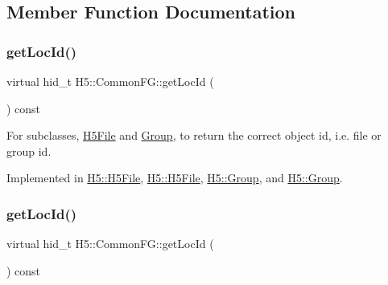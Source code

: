 \subsection{Member Function Documentation}
\mbox{\label{class_h5_1_1_common_f_g_a28dd053d0fa4ebad7fca2949e65d1987}} 
\subsubsection{\texorpdfstring{get\+Loc\+Id()}{getLocId()}\hspace{0.1cm}{\footnotesize\ttfamily [1/2]}}
{\footnotesize\ttfamily virtual hid\+\_\+t H5\+::\+Common\+F\+G\+::get\+Loc\+Id (\begin{DoxyParamCaption}{ }\end{DoxyParamCaption}) const\hspace{0.3cm}{\ttfamily [pure virtual]}}

For subclasses, \hyperlink{class_h5_1_1_h5_file}{H5\+File} and \hyperlink{class_h5_1_1_group}{Group}, to return the correct object id, i.\+e. file or group id. 

Implemented in \hyperlink{class_h5_1_1_h5_file_ab1c5775703262ac913dd164e77d60abc}{H5\+::\+H5\+File}, \hyperlink{class_h5_1_1_h5_file_ab1c5775703262ac913dd164e77d60abc}{H5\+::\+H5\+File}, \hyperlink{class_h5_1_1_group_ae8fa39e9d934d254cd1bc2302a7e6391}{H5\+::\+Group}, and \hyperlink{class_h5_1_1_group_ae8fa39e9d934d254cd1bc2302a7e6391}{H5\+::\+Group}.

\mbox{\label{class_h5_1_1_common_f_g_a28dd053d0fa4ebad7fca2949e65d1987}} 
\subsubsection{\texorpdfstring{get\+Loc\+Id()}{getLocId()}\hspace{0.1cm}{\footnotesize\ttfamily [2/2]}}
{\footnotesize\ttfamily virtual hid\+\_\+t H5\+::\+Common\+F\+G\+::get\+Loc\+Id (\begin{DoxyParamCaption}{ }\end{DoxyParamCaption}) const\hspace{0.3cm}{\ttfamily [pure virtual]}}

